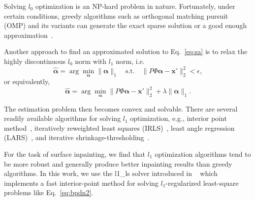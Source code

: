 Solving $l_0$ optimization is an NP-hard problem in nature.
Fortunately, under certain conditions, greedy algorithms such as
orthogonal matching pursuit (OMP) and its variants can generate the
exact sparse solution or a good enough
approximation~\cite{Needell2010,Tropp2007}.

Another approach to find an approximated solution to Eq.~\ref{eq:sa}
is to relax the highly discontinuous $l_0$ norm with $l_1$ norm, i.e.
\begin{equation}
\label{eq:bpdn}
\hat{\mathbf{\alpha}} = \arg\min_{\mathbf{\alpha}} \|\mathbf{\alpha}\|_1 \quad \text{s.t.} \quad \|P\Phi\mathbf{\alpha} - \mathbf{x}'\|_2^2 < \epsilon,
\end{equation}
or equivalently,
\begin{equation}
\label{eq:bpdn2}
\hat{\mathbf{\alpha}} = \arg\min_{\mathbf{\alpha}} \|P\Phi\mathbf{\alpha} - \mathbf{x}'\|_2^2 + \lambda\|\mathbf{\alpha}\|_1.
\end{equation}

The estimation problem then becomes convex and solvable. There are
several readily available algorithms for solving $l_1$ optimization,
e.g., interior point method~\cite{Kim2007}, iteratively reweighted
least squares (IRLS)~\cite{Holland1977}, least angle regression
(LARS)~\cite{Sorkine2004}, and iterative
shrinkage-thresholding~\cite{Daubechies2004}.

For the task of surface inpainting, we find that $l_1$ optimization algorithms tend to be more robust and
generally produce better inpainting results than greedy algorithms. In this work, we use the l1\_ls solver introduced in ~\cite{Kim2007}
which implements a fast interior-point method for solving $l_1$-regularized least-square problems like Eq.~\ref{eq:bpdn2}.

